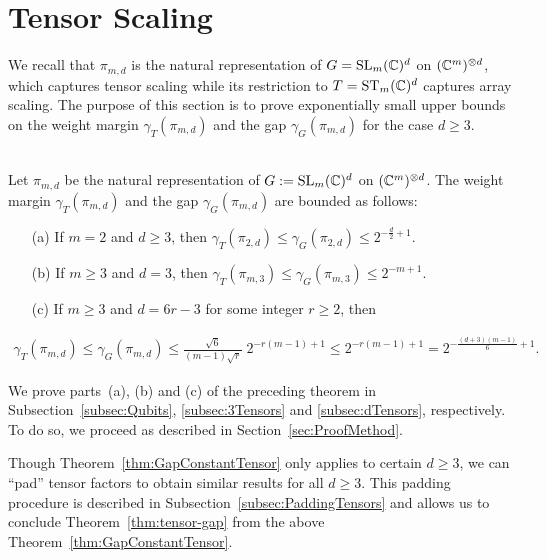 \section{Tensor Scaling} \label{sec:TensorGap}


We recall that $\pi_{m,d}$ is the natural representation of $G = \operatorname{SL}_m(\mathbb C)^d$ on $(\mathbb C^m)^{\otimes d}$, which captures tensor scaling while its restriction to $T = \operatorname{ST}_m(\mathbb C)^d$ captures array scaling.
The purpose of this section is to prove exponentially small upper bounds on the weight margin $\gamma_{T}(\pi_{m,d})$ and the gap $\gamma_G(\pi_{m,d})$ for the case $d \geq 3$.

\begin{theorem} \label{thm:GapConstantTensor}
	\ \\
	Let $\pi_{m,d}$ be the natural representation of $G := \operatorname{SL}_m(\mathbb C)^d$ on $(\mathbb C^m)^{\otimes d}$. The weight margin $\gamma_{T}(\pi_{m,d})$ and the gap $\gamma_G(\pi_{m,d})$ are bounded as follows:
	\begin{itemize}
		\item[(a)] If $m=2$ and $d \geq 3$, then
		$
		\gamma_{T}(\pi_{2,d}) \leq \gamma_G (\pi_{2,d}) \leq 2^{-\frac{d}{2} + 1}.
		$
		\item[(b)] If $m \geq 3$ and $d = 3$, then  $\gamma_{T}(\pi_{m,3}) \leq \gamma_G(\pi_{m,3}) \leq 2^{-m+1}$.
		\item[(c)] If $m \geq 3$ and $d = 6 r - 3$ for some integer $r \geq 2$, then
	\end{itemize}
	\vspace{-1em}
	\begin{align*}
		\gamma_{T}(\pi_{m,d}) \leq \gamma_G(\pi_{m,d}) \leq \frac{\sqrt{6}}{(m-1)\sqrt{r}} \; 2^{-r(m-1) + 1} 
		\leq 2^{- r(m-1) + 1} = 2^{- \frac{(d+3)(m-1)}{6} + 1}.
	\end{align*}
\end{theorem}

We prove parts~(a), (b) and (c) of the preceding theorem in Subsection~\ref{subsec:Qubits}, \ref{subsec:3Tensors} and \ref{subsec:dTensors}, respectively. To do so, we proceed as described in Section~\ref{sec:ProofMethod}.

Though Theorem~\ref{thm:GapConstantTensor} only applies to certain $d \geq 3$, we can ``pad'' tensor factors to obtain similar results for all $d \geq 3$. This padding procedure is described in Subsection~\ref{subsec:PaddingTensors} and allows us to conclude Theorem~\ref{thm:tensor-gap} from the above Theorem~\ref{thm:GapConstantTensor}.


